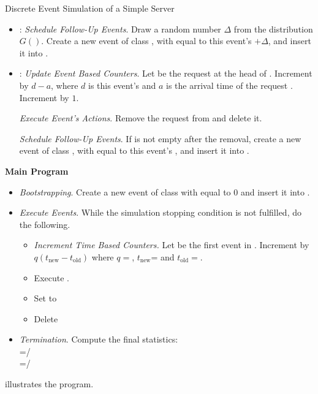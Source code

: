 \begin{ex}{Discrete Event Simulation of a Simple Server}
\begin{itemize}
    \item {}: \emph{Schedule Follow-Up Events}. Draw a
    random number $\Delta$ from the distribution $G()$. Create a new event of class ,
    with  equal to this event's
    $+\Delta$,
    and
    insert it into .

    \item {}: \emph{Update Event Based Counters}. Let  be the request
    at the head of
    . Increment  by $d-a$, where
    $d$ is this event's  and
    $a$ is the arrival time of the request .
    Increment  by $1$.

    \emph{Execute Event's Actions}. Remove the request  from 
    and delete it.

    \emph{Schedule Follow-Up Events}. If  is not empty
    after the removal, create a new event of class ,
    with  equal to this event's
    , and
    insert it into .

\end{itemize}

\begin{sh}
\textbf{Main Program}
\begin{itemize}
    \item \emph{Bootstrapping}. Create a new event of class
     with  equal to $0$ and insert it into
    .
    \item \emph{Execute Events}. While the simulation stopping
    condition is not fulfilled, do the following.
    \begin{itemize}
        \item \emph{Increment Time Based Counters.} Let  be
    the first event in . Increment
      by $q (t_{\mathrm{new}}-
     t_{\mathrm{old}})$
    where $q=$,
    $t_{\mathrm{new}}$=
    and $t_{\mathrm{old}}=$.
        \item Execute .
        \item Set  to 
        \item Delete 
    \end{itemize}
\item \emph{Termination}. Compute the final statistics:\\
=/\\
 =/
\end{itemize}
\end{sh}

 illustrates the program.
\noitemsep
\end{ex}



